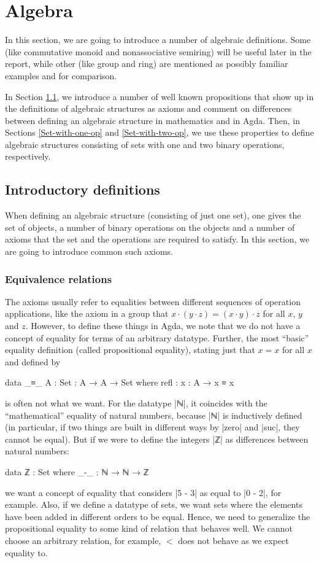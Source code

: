 \chapter{Algebra}
\label{Algebra}
\label{Section:Algebra}
In this section, we are going to introduce a number of algebraic definitions. Some (like commutative monoid and nonassociative semiring) will be useful later in the report, while other (like group and ring) are mentioned as possibly familiar examples and for comparison.

In Section \ref{Intro-defs}, we introduce a number of well known propositions that show up in the definitions of algebraic structures as axioms and comment on differences between defining an algebraic structure in mathematics and in Agda. Then, in Sections \ref{Set-with-one-op} and \ref{Set-with-two-op}, we use these properties to define algebraic structures consisting of sets with one and two binary operations, respectively.
\section{Introductory definitions}
\label{Intro-defs}
When defining an algebraic structure (consisting of just one set), one gives the set of objects, a number of binary operations on the objects and a number of axioms that the set and the operations are required to satisfy. In this section, we are going to introduce common such axioms. 
\subsection{Equivalence relations}
\label{Algebra-equality}
The axioms usually refer to equalities between different sequences of operation applications, like the axiom in a group that $x \cdot (y \cdot z) = (x \cdot y) \cdot z$ for all $x$, $y$ and $z$. However, to define these things in Agda, we note that we do not have a concept of equality for terms of an arbitrary datatype. Further, the most ``basic'' equality definition (called propositional equality), stating just that $x = x$ for all $x$ and defined by
\begin{code}
data _≡_ {A : Set} : A → A → Set where
  refl : {x : A} → x ≡ x
\end{code}
is often not what we want. For the datatype |ℕ|, it coincides with the ``mathematical'' equality of natural numbers, because |ℕ| is inductively defined (in particular, if two things are built in different ways by |zero| and |suc|, they cannot be equal). But if we were to define the integers |ℤ| as differences between natural numbers:
\begin{code}
data ℤ : Set where
  _-_ : ℕ → ℕ → ℤ
\end{code}
we want a concept of equality that considers |5 - 3| as equal to |0 - 2|, for example. Also, if we define a datatype of sets, we want sets where the elements have been added in different orders to be equal. Hence, we need to generalize the propositional equality to some kind of relation that behaves well. We cannot choose an arbitrary relation, for example, $<$ does not behave as we expect equality to. 

